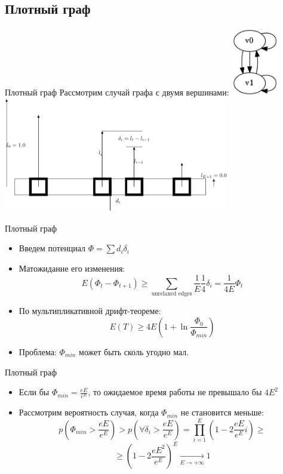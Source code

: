 \documentclass{beamer}
\begin{document}
 \subsection{Плотный граф}
 \begin{frame}{Плотный граф}
  Рассмотрим случай графа с двумя вершинами:
  \includegraphics[height=3cm]{pic/2v_graph.png}
  \includegraphics[height=5cm]{pic/edges.pdf}
 \end{frame}
 
  \begin{frame}{Плотный граф}
  \begin{itemize}
   \item Введем потенциал $\Phi = \sum d_i \delta_i$
   \item Матожидание его изменения: $$E(\Phi_t - \Phi_{t + 1}) \ge \sum_{\text{unrelaxed edges}} \frac{1}{E} \frac{1}{4} \delta_i = \frac{1}{4E} \Phi_t$$
   \item По мультипликативной дрифт-теореме: $$E(T) \ge 4E \left( 1 + \ln\frac{\Phi_0}{\Phi_{min}}\right)$$
   \item Проблема: $\Phi_{min}$ может быть сколь угодно мал.
  \end{itemize}
 \end{frame}
 
 \begin{frame}{Плотный граф}
  \begin{itemize}
   \item Если бы $\Phi_{min} = \frac{eE}{e^E}$, то ожидаемое время работы не превышало бы $4E^2$
   \item Рассмотрим вероятность случая, когда $\Phi_{min}$ не становится меньше:
   $$p\left(\Phi_{min} > \frac{eE}{e^E}\right) > p\left(\forall \delta_i > \frac{eE}{e^E}\right) = \prod_{i=1}^E (1 - 2 \frac{eE}{e^E}i) \ge$$
   $$\ge (1 - 2 \frac{eE^2}{e^E})^E \xrightarrow[E \to +\infty]{} 1 $$
  \end{itemize}
 \end{frame}
 
\end{document}
